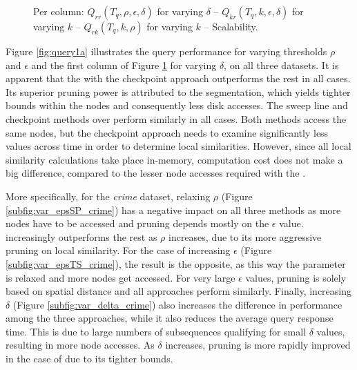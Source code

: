 \begin{figure}[htbp]
\vspace{-5pt}
\caption{Per column: $Q_{rr}(T_q, \rho, \epsilon, \delta)$ for varying $\delta$ -- $Q_{kr}(T_q, k, \epsilon, \delta)$ for varying $k$ -- $Q_{rk}(T_q, k, \rho)$ for varying $k$ -- Scalability. }
\label{fig:exp}
\end{figure}

Figure \ref{fig:query1a} illustrates the query performance for varying thresholds $\rho$ and $\epsilon$ and the first column of Figure \ref{fig:exp} for varying $\delta$, on all three datasets. It is apparent that the \sbtsr with the checkpoint approach outperforms the rest in all cases. Its superior pruning power is attributed to the segmentation, which yields tighter bounds within the nodes and consequently less disk accesses. The sweep line and checkpoint methods over \btsr perform similarly in all cases. Both methods access the same nodes, but the checkpoint approach needs to examine significantly less values across time in order to determine local similarities. However, since all local similarity calculations take place in-memory, computation cost does not make a big difference, compared to the lesser node accesses required with the \sbtsr. 

More specifically, for the {\em crime} dataset, relaxing $\rho$ (Figure \ref{subfig:var_epsSP_crime}) has a negative impact on all three methods as more nodes have to be accessed and pruning depends mostly on the $\epsilon$ value. \sbtsr increasingly outperforms the rest as $\rho$ increases, due to its more aggressive pruning on local similarity. For the case of increasing $\epsilon$ (Figure \ref{subfig:var_epsTS_crime}), the result is the opposite, as this way the parameter is relaxed and more nodes get accessed. For very large $\epsilon$ values, pruning is solely based on spatial distance and all approaches perform similarly. Finally, increasing $\delta$ (Figure \ref{subfig:var_delta_crime}) also increases the difference in performance among the three approaches, while it also reduces the average query response time. This is due to large numbers of subsequences qualifying for small $\delta$ values, resulting in more node accesses. As $\delta$ increases, pruning is more rapidly improved in the case of \sbtsr due to its tighter bounds.

